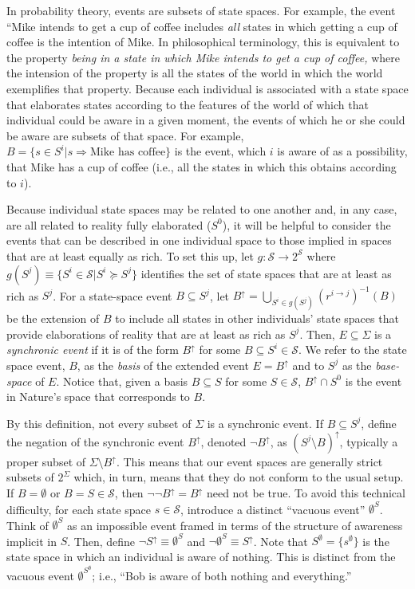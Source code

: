\documentclass[
11pt,
titlepage,
reqno,
]{article}%
\theoremstyle{definition}
\begin{document}
	In probability theory, events are subsets of state spaces. 
	For example, the event ``Mike intends to get a cup of coffee includes \textit{all} states in which getting a cup of coffee is the intention of Mike. 
	In philosophical terminology, this is equivalent to the property \textit{being in a state in which Mike intends to get a cup of coffee,} where the intension of the property is all the states of the world in which the world exemplifies that property.
	Because each individual is associated with a state space that elaborates states according to the features of the world of which that individual could be aware in a given moment, the events of which he or she could be aware are subsets of that space. 
	For example, $B=\{s\in S^i|s\Rightarrow \text{Mike has coffee}\}$ is the event, which $i$ is aware of as a possibility, that Mike has a cup of coffee (i.e., all the states in which this obtains according to $i$).

	Because individual state spaces may be related to one another and, in any case, are all related to reality fully elaborated ($S^0$), it will be helpful to consider the events that can be described in one individual space to those implied in spaces that are at least equally as rich.
	To set this up, let $g:\mathcal{S}\rightarrow 2^{\mathcal{S}}$ where $g(S^j)\equiv\{S^i\in\mathcal {S}|S^i\succeq S^j\}$ identifies the set of state spaces that are at least as rich as $S^j$.
	For a state-space event $B\subseteq S^j$, let $B^{\uparrow}=\bigcup_{S^i\in g(S^j)}\left(r^{i\rightarrow j}\right)^{-1}(B)$ be the extension of $B$ to include all states in other individuals' state spaces that provide elaborations of reality that are at least as rich as $S^j$.
	Then, $E\subseteq \Sigma$ is a \textit{synchronic event} if it is of the form $B^{\uparrow}$ for some $B\subseteq S^i\in \mathcal{S}$.
	We refer to the state space event, $B$, as the \textit{basis} of the extended event $E=B^{\uparrow}$ and to $S^j$ as the \textit{base-space} of $E$.
	Notice that, given a basis $B\subseteq S$ for some $S\in\mathcal{S}$, $B^\uparrow\cap S^0$ is the event in Nature's space that corresponds to $B$.
	
	By this definition, not every subset of $\Sigma$ is a synchronic event.
	If $B\subseteq S^j$, define the negation of the synchronic event $B^{\uparrow}$, denoted $\lnot B^{\uparrow}$, as $(S^j\setminus B)^{\uparrow}$, typically a proper subset of $\Sigma\setminus B^{\uparrow}$.
	This means that our event spaces are generally strict subsets of $2^\Sigma$ which, in turn, means that they do not conform to the usual setup.
	If $B=\emptyset$ or $B=S\in\mathcal{S}$, then $\lnot\lnot B^\uparrow = B^\uparrow$ need not be true.
	To avoid this technical difficulty, for each state space $s\in\mathcal{S}$, introduce a distinct ``vacuous event'' $\emptyset^S$.
	Think of $\emptyset^S$ as an impossible event framed in terms of the structure of awareness implicit in $S$.
	Then, define $\lnot S^\uparrow\equiv \emptyset^S$ and $\lnot \emptyset^S\equiv S^\uparrow$.
	Note that $S^\emptyset=\{s^\emptyset\}$ is the state space in which an individual is aware of nothing. 
	This is distinct from the vacuous event $\emptyset^{S^\emptyset}$; i.e., ``Bob is aware of both nothing and everything.''
\end{document}
